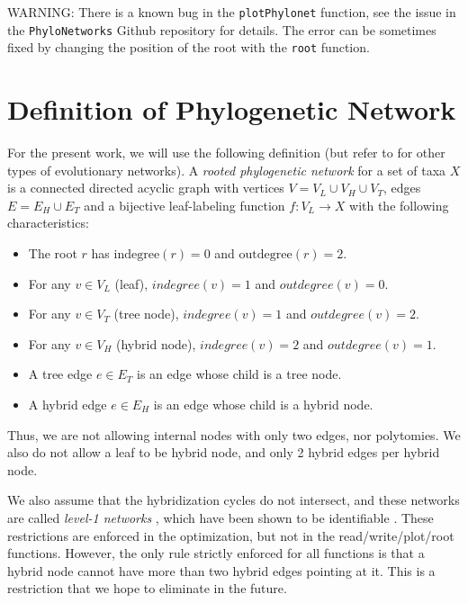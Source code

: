 \documentclass[12pt]{article}
\begin{document}
WARNING: There is a known bug in the \texttt{plotPhylonet} function,
see the issue in the \texttt{PhyloNetworks} Github repository for details.
The error can be sometimes fixed by changing the position of the root
with the \texttt{root} function.



\appendix
\section{Definition of Phylogenetic Network}

For the present work, we will use the following definition (but refer
to \citet{Huson2010} for other types of evolutionary networks).
A \textit{rooted phylogenetic network} for a set of taxa $X$ is a
connected directed acyclic graph with vertices $V=V_L \cup V_H \cup
V_T$, edges $E=E_H \cup E_T$ and a bijective leaf-labeling function
$f:V_L \rightarrow X$ with the following characteristics:
\begin{itemize}
\item The root $r$ has $\mathrm{indegree}(r)=0$ and $\mathrm{outdegree}(r)=2$.
\item{For any $v \in V_L$ (leaf), $indegree(v)=1$ and
    $outdegree(v)=0$.}
\item{For any $v \in V_T$ (tree node), $indegree(v)=1$ and $outdegree(v)=2$.}
\item{For any $v \in V_H$ (hybrid node), $indegree(v)=2$ and $outdegree(v)=1$.}
\item{A tree edge $e \in E_T$ is an edge whose child is a tree node.}
\item{A hybrid edge $e \in E_H$ is an edge whose child is a hybrid node.}
\end{itemize}
Thus, we are not allowing internal nodes with only two edges, nor
polytomies. We also do not allow a leaf to be hybrid node, and only 2
hybrid edges per hybrid node.

We also assume that the hybridization cycles do not intersect, and
these networks are called \textit{level-1 networks} \citep{Huson2010},
which have been shown to be identifiable
\citep{Pardi2015,Solis-Lemus2015}.  These restrictions are enforced in
the optimization, but not in the read/write/plot/root
functions. However, the only rule strictly enforced for all functions
is that a hybrid node cannot have more than two hybrid edges pointing
at it. This is a restriction that we hope to eliminate in the future.
\end{document}
